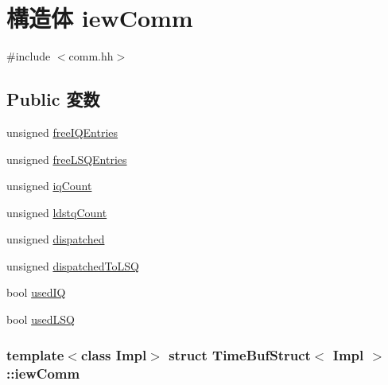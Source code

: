\hypertarget{structTimeBufStruct_1_1iewComm}{
\section{構造体 iewComm}
\label{structTimeBufStruct_1_1iewComm}
}


{\ttfamily \#include $<$comm.hh$>$}\subsection*{Public 変数}
\begin{DoxyCompactItemize}
\item 
unsigned \hyperlink{structTimeBufStruct_1_1iewComm_a864079a61010b1280286f2fe3c01461a}{freeIQEntries}
\item 
unsigned \hyperlink{structTimeBufStruct_1_1iewComm_a56f28800f89ab3f7d830f7df88638aec}{freeLSQEntries}
\item 
unsigned \hyperlink{structTimeBufStruct_1_1iewComm_aa5611b833c5fbf4d408ea7089af4363d}{iqCount}
\item 
unsigned \hyperlink{structTimeBufStruct_1_1iewComm_a52109cc78528c91e02ffca5527cf0096}{ldstqCount}
\item 
unsigned \hyperlink{structTimeBufStruct_1_1iewComm_a6f92db6a7ecb5f643d615a343e979454}{dispatched}
\item 
unsigned \hyperlink{structTimeBufStruct_1_1iewComm_a245527337573c4adaa818d22ab45c148}{dispatchedToLSQ}
\item 
bool \hyperlink{structTimeBufStruct_1_1iewComm_aff147844c2a6343e51b2edcbc1c8483a}{usedIQ}
\item 
bool \hyperlink{structTimeBufStruct_1_1iewComm_a45425b23616d043e2fc9f582ab422e80}{usedLSQ}
\end{DoxyCompactItemize}
\subsubsection*{template$<$class Impl$>$ struct TimeBufStruct$<$ Impl $>$::iewComm}



